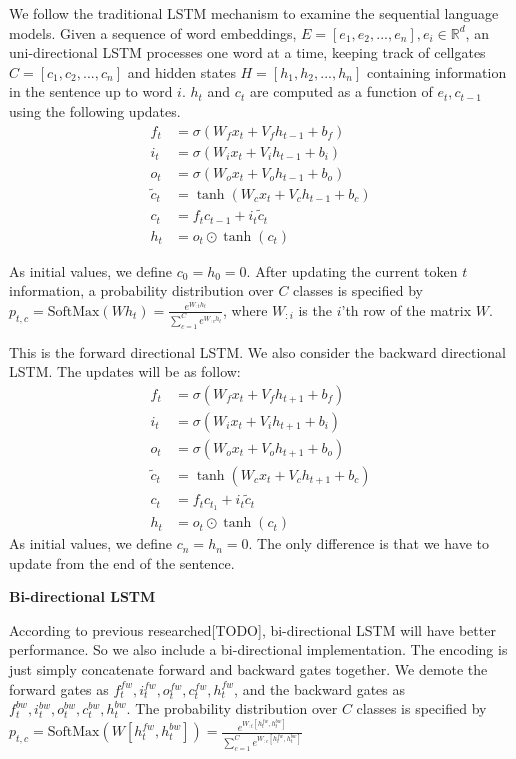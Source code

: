 \documentclass{article}
\begin{document}
We follow the traditional LSTM mechanism to examine the sequential language models. Given a sequence of word embeddings, $E = [e_1, e_2, ... , e_n], e_i \in \mathbb{R}^d$, an  uni-directional LSTM processes one word at a time, keeping track of cellgates $C = [c_1, c_2, ... , c_n]$ and hidden states $H = [h_1, h_2, ... , h_n]$ containing information in the sentence up to word $i$. $h_t$ and $c_t$ are computed as a function of $e_t, c_{t-1}$ using the following updates.
\begin{align}
f_t & = \sigma(W_f x_t + V_f h_{t - 1} + b_f) \\
i_t & = \sigma(W_i x_t + V_i h_{t - 1} + b_i) \\
o_t & = \sigma(W_o x_t + V_o h_{t - 1} + b_o) \\
\tilde{c}_t & = \tanh(W_c x_t + V_c h_{t - 1} + b_c) \\
c_t & = f_t c_{t - 1} + i_t \tilde{c}_t \\
h_t & = o_t \odot \tanh(c_t)
\end{align}

As initial values, we define $c_0=h_0=0$. 
After updating the current token $t$ information, a probability distribution over $C$ classes is specified by $p_{t, c} = \text{SoftMax}(W h_t) = \frac{e^{W_{:t} h_t}}{\sum_{c = 1} ^ C e^{W_{:c} h_t}}$, where $W_{:i}$ is the $i$'th row of the matrix $W$.

This is the forward directional LSTM. We also consider the backward directional LSTM. The updates will be as follow:
\begin{align}
f_t & = \sigma(W_f x_t + V_f h_{t + 1} + b_f) \\
i_t & = \sigma(W_i x_t + V_i h_{t + 1} + b_i) \\
o_t & = \sigma(W_o x_t + V_o h_{t + 1} + b_o) \\
\tilde{c}_t & = \tanh(W_c x_t + V_c h_{t + 1} + b_c) \\
c_t & = f_t c_{t _ 1} + i_t \tilde{c}_t \\
h_t & = o_t \odot \tanh(c_t)
\end{align}
As initial values, we define $c_n=h_n=0$. The only difference is that we have to update from the end of the sentence.

\textbf{Bi-directional LSTM}

According to previous researched[TODO], bi-directional LSTM will have better performance. So we also include a bi-directional implementation. The encoding is just simply concatenate forward and backward gates together. We demote the forward gates as $f_t^{fw}, i_t^{fw}, o_t^{fw}, c_t^{fw}, h_t^{fw}$, and the backward gates as $f_t^{bw}, i_t^{bw}, o_t^{bw}, c_t^{bw}, h_t^{bw}$. The probability distribution over $C$ classes is specified by $p_{t, c} = \text{SoftMax}(W [h_t^{fw}, h_t^{bw}]) = \frac{e^{W_{:t} [h_t^{fw}, h_t^{bw}]}}{\sum_{c = 1} ^ C e^{W_{:c} [h_t^{fw}, h_t^{bw}]}}$
\end{document}

